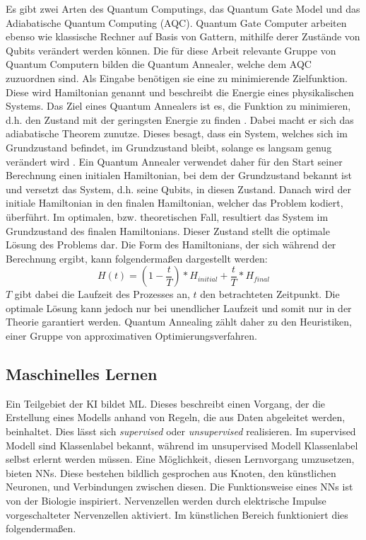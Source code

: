 Es gibt zwei Arten des Quantum Computings, das Quantum Gate Model und das Adiabatische Quantum Computing (AQC). Quantum Gate Computer arbeiten ebenso wie klassische Rechner auf Basis von Gattern, mithilfe derer Zustände von Qubits verändert werden können. Die für diese Arbeit relevante Gruppe von Quantum Computern bilden die Quantum Annealer, welche dem AQC zuzuordnen sind. Als Eingabe benötigen sie eine zu minimierende Zielfunktion. Diese wird Hamiltonian genannt und beschreibt die Energie eines physikalischen Systems. Das Ziel eines Quantum Annealers ist es, die Funktion zu minimieren, d.h. den Zustand mit der geringsten Energie zu finden \cite{qc-homeister}. Dabei macht er sich das adiabatische Theorem zunutze. Dieses besagt, dass ein System, welches sich im Grundzustand befindet, im Grundzustand bleibt, solange es langsam genug verändert wird \cite{adiabatic}. Ein Quantum Annealer verwendet daher für den Start seiner Berechnung einen initialen Hamiltonian, bei dem der Grundzustand bekannt ist und versetzt das System, d.h. seine Qubits, in diesen Zustand. Danach wird der initiale Hamiltonian in den finalen Hamiltonian, welcher das Problem kodiert, überführt. Im optimalen, bzw. theoretischen Fall, resultiert das System im Grundzustand des finalen Hamiltonians. Dieser Zustand stellt die optimale Lösung des Problems dar. Die Form des Hamiltonians, der sich während der Berechnung ergibt, kann folgendermaßen dargestellt werden:
\begin{equation}
H(t) = (1 - \frac{t}{T}) * H_{initial} + \frac{t}{T} * H_{final}
\end{equation}
$T$ gibt dabei die Laufzeit des Prozesses an, $t$ den betrachteten Zeitpunkt. Die optimale Lösung kann jedoch nur bei unendlicher Laufzeit und somit nur in der Theorie garantiert werden.
Quantum Annealing zählt daher zu den Heuristiken, einer Gruppe von approximativen Optimierungsverfahren. \cite{qc-homeister, infinite, heuristic}

\subsection{Maschinelles Lernen}
\label{subsec:basics-ml}
Ein Teilgebiet der KI bildet ML. Dieses beschreibt einen Vorgang, der die Erstellung eines Modells anhand von Regeln, die aus Daten abgeleitet werden, beinhaltet. Dies lässt sich \emph{supervised} oder \emph{unsupervised} realisieren. Im supervised Modell sind Klassenlabel bekannt, während im unsupervised Modell Klassenlabel selbst erlernt werden müssen. Eine Möglichkeit, diesen Lernvorgang umzusetzen, bieten NNs. Diese bestehen bildlich gesprochen aus Knoten, den künstlichen Neuronen, und Verbindungen zwischen diesen. Die Funktionsweise eines NNs ist von der Biologie inspiriert. Nervenzellen werden durch elektrische Impulse vorgeschalteter Nervenzellen aktiviert. Im künstlichen Bereich funktioniert dies folgendermaßen.

